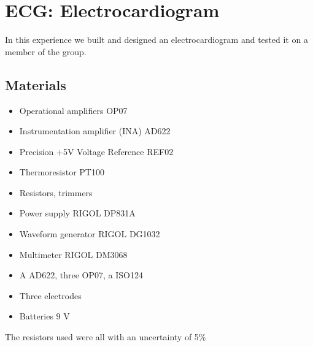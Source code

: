 \chapter{ECG: Electrocardiogram}
In this experience we built and designed an electrocardiogram and tested it on a member of the group.

\section{Materials}
\begin{itemize}
\item Operational amplifiers OP07
\item Instrumentation amplifier (INA) AD622
\item Precision +5V Voltage Reference REF02
\item Thermoresistor PT100
\item Resistors, trimmers
\item Power supply RIGOL DP831A
\item Waveform generator RIGOL DG1032
\item Multimeter RIGOL DM3068
\item A AD622, three OP07, a ISO124
\item Three electrodes
\item Batteries $9$ V
\end{itemize}
The resistors used were all with an uncertainty of 5\%

